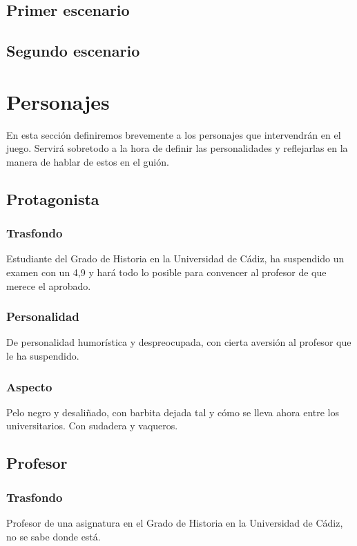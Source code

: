         \subsection{Primer escenario}
        \subsection{Segundo escenario}
        
    \section{Personajes}
    En esta sección definiremos brevemente a los personajes que intervendrán en el juego. Servirá sobretodo a la hora de definir las personalidades y reflejarlas en la manera de hablar de estos en el guión.
    
        \subsection{Protagonista}
            \subsubsection{Trasfondo}
            Estudiante del Grado de Historia en la Universidad de Cádiz, ha suspendido un examen con un 4,9 y hará todo lo posible para convencer al profesor de que merece el aprobado.
            \subsubsection{Personalidad}
            De personalidad humorística y despreocupada, con cierta aversión al profesor que le ha suspendido.
            \subsubsection{Aspecto}
            Pelo negro y desaliñado, con barbita dejada tal y cómo se lleva ahora entre los universitarios. Con sudadera y vaqueros.
                
        \subsection{Profesor}
            \subsubsection{Trasfondo}
            Profesor de una asignatura en el Grado de Historia en la Universidad de Cádiz, no se sabe donde está.
